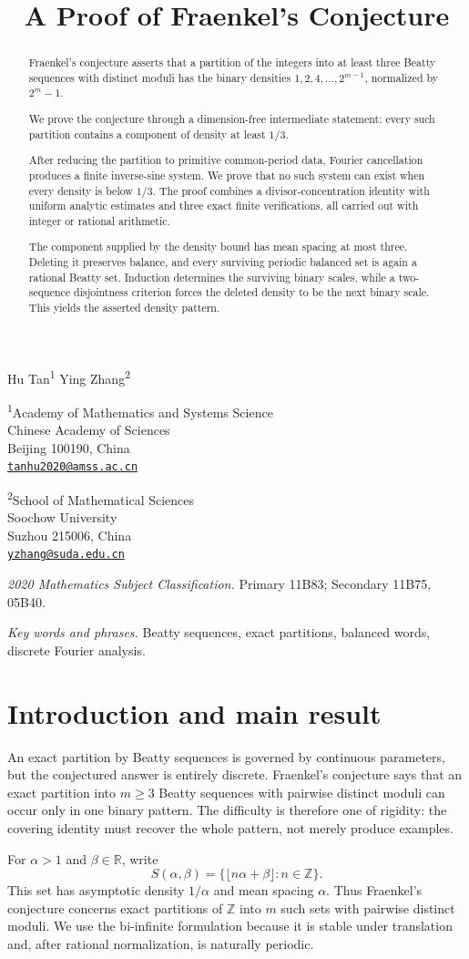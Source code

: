 \documentclass[11pt]{article}
\title{A Proof of Fraenkel's Conjecture}
\author{}
\date{}
\makeatletter
\renewcommand{\maketitle}{%
  \begin{center}

    \vspace*{-1.0em}

    {\LARGE
      \@title
      \par
    }

    \vspace{1.15em}

    {\large
      Hu Tan\textsuperscript{1}
      \hspace{2.0em}
      Ying Zhang\textsuperscript{2}
      \par
    }

    \vspace{0.85em}

    \begin{minipage}[t]{0.45\textwidth}
      \centering
      \small
      \textsuperscript{1}Academy of Mathematics and Systems Science\\
      Chinese Academy of Sciences\\
      Beijing 100190, China\\[0.25em]
      \footnotesize
      \href{mailto:tanhu2020@amss.ac.cn}
      {\texttt{tanhu2020@amss.ac.cn}}
    \end{minipage}
    \hspace{0.035\textwidth}
    \begin{minipage}[t]{0.45\textwidth}
      \centering
      \small
      \textsuperscript{2}School of Mathematical Sciences\\
      Soochow University\\
      Suzhou 215006, China\\[0.25em]
      \footnotesize
      \href{mailto:yzhang@suda.edu.cn}
      {\texttt{yzhang@suda.edu.cn}}
    \end{minipage}

    \vspace{0.9em}

  \end{center}

  \vspace{0.7em}
}
\theoremstyle{definition}
\theoremstyle{remark}
\newcommand{\Z}{\mathbb Z}
\makeatother
\begin{document}
\maketitle

\begin{abstract}
Fraenkel's conjecture asserts that a partition of the integers into at least three Beatty sequences with distinct moduli has the binary densities \(1,2,4,\ldots,2^{m-1}\), normalized by \(2^m-1\).

We prove the conjecture through a dimension-free intermediate statement:
every such partition contains a component of density at least \(1/3\).

After reducing the partition to primitive common-period data, Fourier
cancellation produces a finite inverse-sine system.  We prove that no such
system can exist when every density is below \(1/3\).  The proof combines a
divisor-concentration identity with uniform analytic estimates and three
exact finite verifications, all carried out with integer or rational
arithmetic. 

The component supplied by the density bound has mean spacing at most three. Deleting it preserves balance, and every surviving periodic balanced set is
again a rational Beatty set. Induction determines the surviving binary
scales, while a two-sequence disjointness criterion forces the deleted density
to be the next binary scale. This yields the asserted density pattern.
\end{abstract}

\smallskip
\noindent\textit{2020 Mathematics Subject Classification.}
Primary 11B83; Secondary 11B75, 05B40.

\smallskip
\noindent\textit{Key words and phrases.}
Beatty sequences, exact partitions, balanced words, discrete Fourier analysis.
\section{Introduction and main result}

An exact partition by Beatty sequences is governed by continuous parameters,
but the conjectured answer is entirely discrete.  Fraenkel's conjecture says
that an exact partition into \(m\ge3\) Beatty sequences with pairwise distinct
moduli can occur only in one binary pattern.  The difficulty is therefore one
of rigidity: the covering identity must recover the whole pattern, not merely
produce examples.

For \(\alpha>1\) and \(\beta\in\mathbb R\), write
\[
 S(\alpha,\beta)=\{\lfloor n\alpha+\beta\rfloor:n\in\Z\}.
\]
This set has asymptotic density \(1/\alpha\) and mean spacing \(\alpha\).
Thus Fraenkel's conjecture concerns exact partitions of \(\Z\) into \(m\)
such sets with pairwise distinct moduli.  We use the bi-infinite formulation
because it is stable under translation and, after rational normalization,
is naturally periodic.
\end{document}
